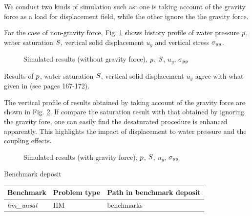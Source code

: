 We conduct two kinds of simulation such as:
 one is taking account of the gravity force as a load for displacement field, while the other ignore the the gravity force.

For the case of non-gravity force, Fig. \ref{fig_HM_sat_nog} shows history profile of water pressure
$p$, water saturation $S$, vertical solid
displacement $u_y$ and vertical stress $\sigma_{yy}$.
\begin{figure}[!htb]
  \begin{center}
  \end{center}
\caption{Simulated results (without gravity force), $p$, $S$,
 $u_y$, $\sigma_{yy}$ }
  \label{fig_HM_sat_nog}
\end{figure}
Results of $p$, water saturation $S$, vertical solid
displacement $u_y$ agree with what given in \cite{LewSch:98} (see pages 167-172).


The vertical profile of results obtained by taking account of the gravity force are shown in Fig. \ref{fig_HM_sat_g}.
If compare the saturation result with that obtained by ignoring the gravity fore, one can easily find the
 desaturated procedure is enhanced apparently. This highlights the impact of displacement to water pressure and
  the coupling effects.
\begin{figure}[!htb]
  \begin{center}
  \end{center}
\caption{Simulated results (with gravity force), $p$, $S$,
 $u_y$, $\sigma_{yy}$}
  \label{fig_HM_sat_g}
\end{figure}

Benchmark deposit

\begin{tabular}{|l|l|l|}
  \hline
  Benchmark & Problem type & Path in benchmark deposit \\
  \hline
 \emph{hm\_unsat}& HM & benchmarks\verb\HM\ \\
  \hline
\end{tabular}

